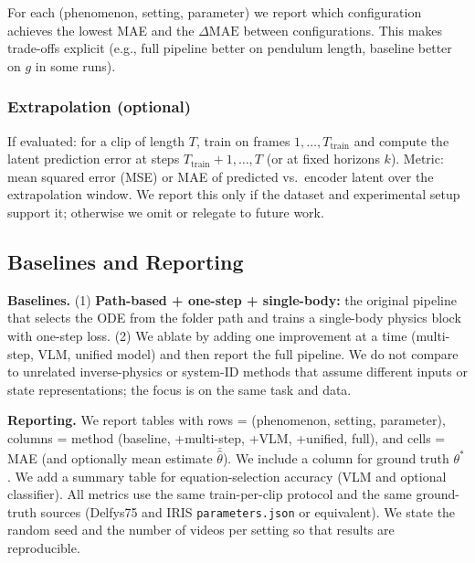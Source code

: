 For each (phenomenon, setting, parameter) we report which configuration achieves the lowest MAE and the $\Delta\mathrm{MAE}$ between configurations. This makes trade-offs explicit (e.g., full pipeline better on pendulum length, baseline better on $g$ in some runs).

\subsubsection{Extrapolation (optional)}
\label{sec:metrics_extra}

If evaluated: for a clip of length $T$, train on frames $1,\ldots,T_{\mathrm{train}}$ and compute the latent prediction error at steps $T_{\mathrm{train}}+1, \ldots, T$ (or at fixed horizons $k$). Metric: mean squared error (MSE) or MAE of predicted vs.\ encoder latent over the extrapolation window. We report this only if the dataset and experimental setup support it; otherwise we omit or relegate to future work.

\subsection{Baselines and Reporting}
\label{sec:eval_baselines}

\textbf{Baselines.} (1) \textbf{Path-based + one-step + single-body:} the original pipeline that selects the ODE from the folder path and trains a single-body physics block with one-step loss. (2) We ablate by adding one improvement at a time (multi-step, VLM, unified model) and then report the full pipeline. We do not compare to unrelated inverse-physics or system-ID methods that assume different inputs or state representations; the focus is on the same task and data.

\textbf{Reporting.} We report tables with rows = (phenomenon, setting, parameter), columns = method (baseline, +multi-step, +VLM, +unified, full), and cells = MAE (and optionally mean estimate $\bar{\hat{\theta}}$). We include a column for ground truth $\theta^*$. We add a summary table for equation-selection accuracy (VLM and optional classifier). All metrics use the same train-per-clip protocol and the same ground-truth sources (Delfys75 and IRIS \texttt{parameters.json} or equivalent). We state the random seed and the number of videos per setting so that results are reproducible.
